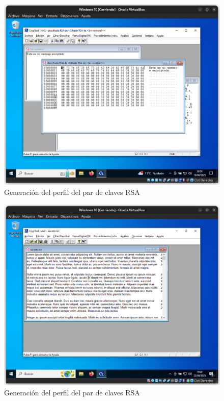 \begin{figure}[H]
    \includegraphics[width=15cm]{ClavesRSA-07.png}
    \caption{Generación del perfil del par de claves RSA}
\end{figure}

\begin{figure}[H]
    \includegraphics[width=15cm]{EncriptadoRSA-1}
    \caption{Generación del perfil del par de claves RSA}
\end{figure}

